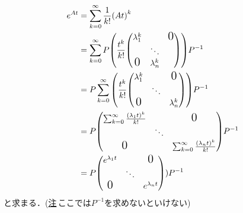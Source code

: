 \documentclass[autodetect-engine,dvipdfmx-if-dvi,ja=standard]{bxjsarticle}
\theoremstyle{mystyle1}
\theoremstyle{mystyle2}
\newcommand{\Largezero}{\ensuremath{\text{\Large{0}}}}
\begin{document}
\begin{align*}
  e^{At}
                                                 & =\sum_{k=0}^\infty\frac{1}{k!}\qty(At)^k                                                       \\
                                                 & =\sum_{k=0}^\infty P\qty(\frac{t^k}{k!}\mqty(
  \lambda_1^k                                    &                                               & \Largezero                                     \\
                                                 & \ddots                                        &                                                \\
  \Largezero                                     & \lambda_n^k
  ))P^{-1}                                                                                                                                        \\
                                                 & =P\sum_{k=0}^\infty \qty(\frac{t^k}{k!}\mqty(
  \lambda_1^k                                    &                                               & \Largezero                                     \\
                                                 & \ddots                                        &                                                \\
  \Largezero                                     &                                               & \lambda_n^k
  ))P^{-1}                                                                                                                                        \\
                                                 & =P\mqty(
  \sum_{k=0}^\infty\frac{\qty(\lambda_1t)^k}{k!} &                                               & \Largezero                                     \\
                                                 & \ddots                                        &                                                \\
  \Largezero                                     &                                               & \sum_{k=0}^\infty\frac{\qty(\lambda_nt)^k}{k!}
  )P^{-1}                                                                                                                                         \\
                                                 & =P\mqty(
  e^{\lambda_1t}                                 &                                               & \Largezero                                     \\
                                                 & \ddots                                        &                                                \\
  \Largezero                                     &                                               & e^{\lambda_nt}
  ))P^{-1}
\end{align*}
と求まる．(\underline{注}\,ここでは$P^{-1}$を求めないといけない)
\end{document}
